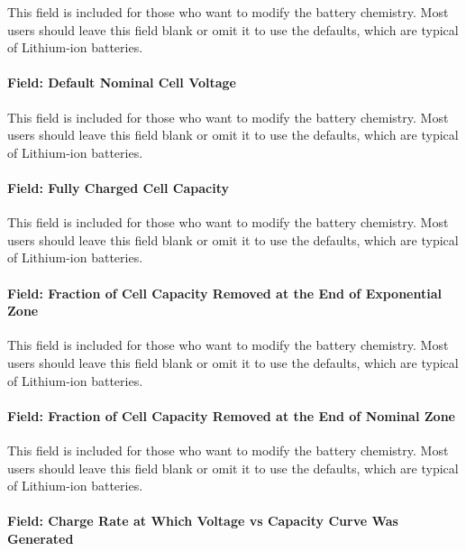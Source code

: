 This field is included for those who want to modify the battery chemistry. Most users should leave this field blank or omit it to use the defaults, which are typical of Lithium-ion batteries.

\paragraph{Field: Default Nominal Cell Voltage}\label{liion-vnom-default}

This field is included for those who want to modify the battery chemistry. Most users should leave this field blank or omit it to use the defaults, which are typical of Lithium-ion batteries.

\paragraph{Field: Fully Charged Cell Capacity}\label{liion-qfull}

This field is included for those who want to modify the battery chemistry. Most users should leave this field blank or omit it to use the defaults, which are typical of Lithium-ion batteries.

\paragraph{Field: Fraction of Cell Capacity Removed at the End of Exponential Zone}\label{liion-qexp}

This field is included for those who want to modify the battery chemistry. Most users should leave this field blank or omit it to use the defaults, which are typical of Lithium-ion batteries.

\paragraph{Field: Fraction of Cell Capacity Removed at the End of Nominal Zone}\label{liion-qnom}

This field is included for those who want to modify the battery chemistry. Most users should leave this field blank or omit it to use the defaults, which are typical of Lithium-ion batteries.

\paragraph{Field: Charge Rate at Which Voltage vs Capacity Curve Was Generated}\label{liion-crate}

